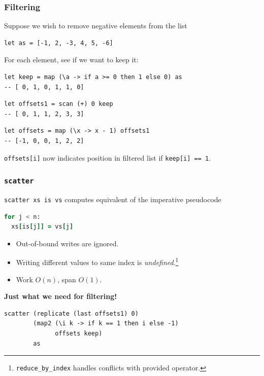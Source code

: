 \begin{frame}[fragile]
  \frametitle{Filtering}

  Suppose we wish to remove negative elements from the list

\begin{lstlisting}
let as = [-1, 2, -3, 4, 5, -6]
\end{lstlisting}

\pause

  For each element, see if we want to keep it:

\begin{lstlisting}
let keep = map (\a -> if a >= 0 then 1 else 0) as
-- [ 0, 1, 0, 1, 1, 0]
\end{lstlisting}

\pause

\begin{lstlisting}
let offsets1 = scan (+) 0 keep
-- [ 0, 1, 1, 2, 3, 3]
\end{lstlisting}

\pause

\begin{lstlisting}
let offsets = map (\x -> x - 1) offsets1
-- [-1, 0, 0, 1, 2, 2]
\end{lstlisting}

\pause

\texttt{offsets[i]} now indicates position in filtered list if
\texttt{keep[i] == 1}.

\end{frame}

\begin{frame}[fragile]
  \frametitle{\texttt{scatter}}

  \texttt{scatter xs is vs} computes equivalent of the imperative
  pseudocode

\begin{lstlisting}[language=Fortran]
for j < n:
  xs[is[j]] = vs[j]
\end{lstlisting}

  \begin{itemize}
  \item Out-of-bound writes are ignored.
  \item Writing different values to same index is
    \textit{undefined}.\footnote{\texttt{reduce\_by\_index} handles conflicts with provided operator.}
  \item Work $O(n)$, span $O(1)$.
  \end{itemize}

  \bigskip
  \textbf{Just what we need for filtering!}

  \pause

\begin{lstlisting}
scatter (replicate (last offsets1) 0)
        (map2 (\i k -> if k == 1 then i else -1)
              offsets keep)
        as
\end{lstlisting}

\end{frame}

